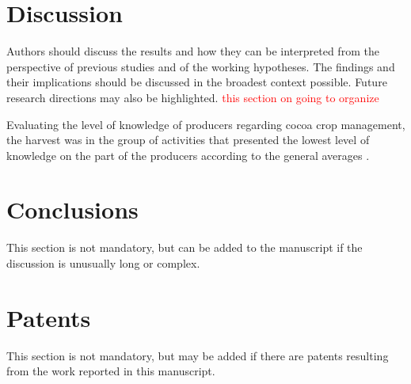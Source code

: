 \documentclass[gene,journal,article,submit,moreauthors,pdftex]{Definitions/mdpi}
\begin{document}
\section{Discussion}

Authors should discuss the results and how they can be interpreted from the perspective of previous studies and of the working hypotheses. The findings and their implications should be discussed in the broadest context possible. Future research directions may also be highlighted.
\textcolor{red}{this section on going to organize}

Evaluating the level of knowledge of producers regarding cocoa crop management, the harvest was in the group of activities that presented the lowest level of knowledge on the part of the producers according to the general averages \citep{Gutierrez2020}. 

  

\section{Conclusions}

This section is not mandatory, but can be added to the manuscript if the discussion is unusually long or complex.

\section{Patents}

This section is not mandatory, but may be added if there are patents resulting from the work reported in this manuscript.

\vspace{6pt} 


\end{document}
